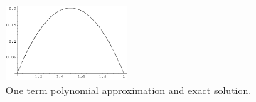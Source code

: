 \begin{Solution}
\begin{enumerate}
    \begin{figure}[h!]
      \begin{center}
        \includegraphics[width=0.4\textwidth]{cv/cv/p3_1t}
      \end{center}
      \caption{One term polynomial approximation and exact solution.}
      \label{p3_1t}
    \end{figure}
  \end{enumerate}
\end{Solution}



